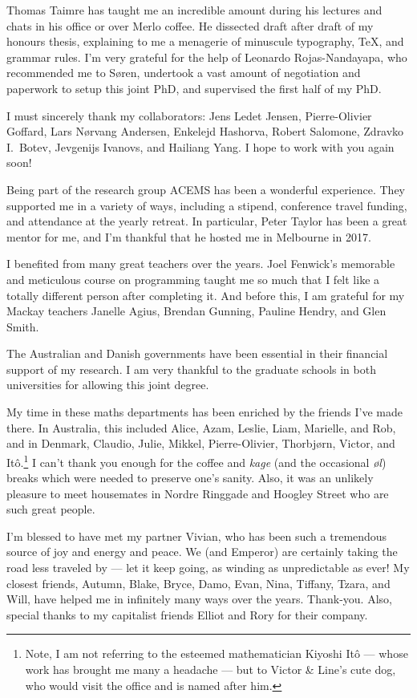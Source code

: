 Thomas Taimre has taught me an incredible amount during his lectures and chats in his office or over Merlo coffee. He dissected draft after draft of my honours thesis, explaining to me a menagerie of minuscule typography, \TeX, and grammar rules. I'm very grateful for the help of Leonardo Rojas-Nandayapa, who recommended me to S{\o}ren, undertook a vast amount of negotiation and paperwork to setup this joint PhD, and supervised the first half of my PhD.

I must sincerely thank my collaborators: Jens Ledet Jensen, Pierre-Olivier Goffard, Lars N{\o}rvang Andersen, Enkelejd Hashorva, Robert Salomone, Zdravko I.\ Botev, Jevgenijs Ivanovs, and Hailiang Yang. I hope to work with you again soon!

Being part of the research group ACEMS has been a wonderful experience. They supported me in a variety of ways, including a stipend, conference travel funding, and attendance at the yearly retreat. In particular, Peter Taylor has been a great mentor for me, and I'm thankful that he hosted me in Melbourne in 2017.

I benefited from many great teachers over the years. Joel Fenwick's memorable and meticulous course on programming taught me so much that I felt like a totally different person after completing it. And before this, I am grateful for my Mackay teachers Janelle Agius, Brendan Gunning, Pauline Hendry, and Glen Smith.

The Australian and Danish governments have been essential in their financial support of my research. I am very thankful to the graduate schools in both universities for allowing this joint degree.

My time in these maths departments has been enriched by the friends I've made there. In Australia, this included Alice, Azam, Leslie, Liam, Marielle, and Rob, and in Denmark, Claudio, Julie, Mikkel, Pierre-Olivier, Thorbj{\o}rn, Victor, and It{\^o}.\footnote{Note, I am not referring to the esteemed mathematician Kiyoshi It{\^o} --- whose work has brought me many a headache --- but to Victor \& Line's cute dog, who would visit the office and is named after him.} I can't thank you enough for the coffee and \emph{kage} (and the occasional \emph{{\o}l}) breaks which were needed to preserve one's sanity. Also, it was an unlikely pleasure to meet housemates in Nordre Ringgade and Hoogley Street who are such great people.

I'm blessed to have met my partner Vivian, who has been such a tremendous source of joy and energy and peace. We (and Emperor) are certainly taking the road less traveled by --- let it keep going, as winding as unpredictable as ever! My closest friends, Autumn, Blake, Bryce, Damo, Evan, Nina, Tiffany, Tzara, and Will, have helped me in infinitely many ways over the years. Thank-you. Also, special thanks to my capitalist friends Elliot and Rory for their company.

